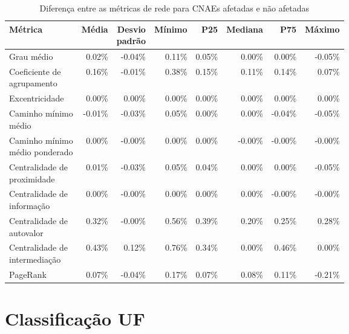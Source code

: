 \begin{table}[htb]
\centering
\caption{Diferença entre as métricas de rede para CNAEs afetadas e não afetadas}
\label{tab:metricas-redes-pandemia:diferenca-afetadas-por-cnae}
\begin{tabular}{l|rrrrrrr}
\toprule
Métrica & Média & \shortstack{Desvio\\padrão} & Mínimo & P25 & Mediana & P75 & Máximo \\
\midrule
Grau médio                     &  0.02\% & -0.04\% & 0.11\% & 0.05\% &  0.00\% &  0.00\% & -0.05\% \\ \hline
\shortstack[l]{Coeficiente de\\agrupamento}     &  0.16\% & -0.01\% & 0.38\% & 0.15\% &  0.11\% &  0.14\% &  0.07\% \\ \hline
Excentricidade                 &  0.00\% &  0.00\% & 0.00\% & 0.00\% &  0.00\% &  0.00\% &  0.00\% \\ \hline
\shortstack[l]{Caminho mínimo\\médio}           & -0.01\% & -0.03\% & 0.05\% & 0.00\% &  0.00\% & -0.04\% & -0.05\% \\ \hline
\shortstack[l]{Caminho mínimo\\médio ponderado} &  0.00\% & -0.00\% & 0.00\% & 0.00\% & -0.00\% & -0.00\% & -0.00\% \\ \hline
\shortstack[l]{Centralidade de\\proximidade}    &  0.01\% & -0.03\% & 0.05\% & 0.04\% &  0.00\% &  0.00\% & -0.05\% \\ \hline
\shortstack[l]{Centralidade de\\informação}     &  0.00\% & -0.00\% & 0.00\% & 0.00\% &  0.00\% & -0.00\% & -0.00\% \\ \hline
\shortstack[l]{Centralidade de\\autovalor}      &  0.32\% & -0.00\% & 0.56\% & 0.39\% &  0.20\% &  0.25\% &  0.28\% \\ \hline
\shortstack[l]{Centralidade de\\intermediação}  &  0.43\% &  0.12\% & 0.76\% & 0.34\% &  0.00\% &  0.46\% &  0.00\% \\ \hline
PageRank                       &  0.07\% & -0.04\% & 0.17\% & 0.07\% &  0.08\% &  0.11\% & -0.21\% \\
\bottomrule
\end{tabular}
\fdadospesquisa
\end{table}

\section{Classificação UF}


